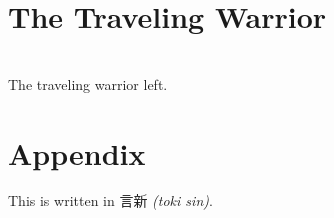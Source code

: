 \documentclass{ctexart}
\begin{document}
\section[人去ぴ鬥]{
  \Huge\englishundertokisin
    {}
    {\large\normalfont{}The Traveling Warrior}
}
{
\noindent
\begin{minipage}[t]{5.75cm}
{\textCJKserif{}\large
  \\
    \scriptsize
  The traveling warrior left.\\
}
\end{minipage}
}

\newpage

\section[Appendix]{\Huge{}Appendix}
This is written in 言新 {\it{}(toki sin)}.\\

\fancyfoot[L]{}
\end{document}
